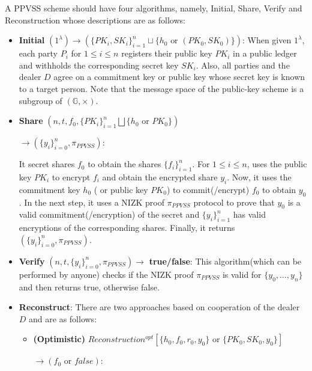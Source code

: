 \begin{definition}[PPVSS]
    A PPVSS scheme should have four algorithms, namely, Initial, Share, Verify and Reconstruction whose 
    descriptions are as follows:
    \begin{itemize}
        \item \textbf{Initial} $(1^\lambda)\rightarrow(\{PK_i,SK_i\}_{i=1}^n\sqcup\{h_0\text{ or }(PK_0,SK_0)\})$: 
          When given $1^\lambda$, each party $P_i$ for $1\leq i\leq n$ registers their public key $PK_i$ in a 
          public ledger and withholds the corresponding secret key $SK_i$. Also, all parties and the dealer $D$ 
          agree on a commitment key or public key whose secret key is known to a target person. 
          Note that the message space of the public-key scheme is a subgroup of $(\mathbb{G},\times)$.
        \item \textbf{Share} $(n,t,f_0,\{PK_i\}_{i=1}^n\bigsqcup\{h_0\text{ or }PK_0\})$\par
          $\rightarrow(\{y_i\}_{i=0}^n,\pi_{PPVSS})$:\par 
          It secret shares $f_0$ to obtain the shares $\{f_i\}_{i=1}^n$. For $1\leq i\leq n$, uses 
          the public key $PK_i$ to encrypt $f_i$ and obtain the encrypted share $y_i$. Now, it uses the commitment 
          key $h_0$ ( or public key $PK_0$) to commit(/encrypt) $f_0$ to obtain $y_0$. 
          In the next step, it uses a NIZK proof $\pi_{PPVSS}$ protocol to prove that $y_0$ is a valid 
          commitment(/encryption) of the secret and $\{y_i\}_{i=1}^n$ has valid encryptions of the corresponding shares. Finally, it returns $(\{y_i\}_{i=0}^n,\pi_{PPVSS})$.\par
        \item \textbf{Verify} $(n,t,\{y_i\}_{i=0}^n,\pi_{PPVSS})\rightarrow$ \textbf{true/false}: 
          This algorithm(which can be performed by anyone) checks if the NIZK proof $\pi_{PPVSS}$ is valid for 
          $\{y_0,\dots,y_n\}$ and then returns true, otherwise false.\par
        \item \textbf{Reconstruct}: There are two approaches based on cooperation of the dealer $D$ and are as follows:
          \begin{itemize}
            \item \textbf{(Optimistic)} $Reconstruction^{opt}[\{h_0,f_0,r_0,y_0\}\text{ or }\{PK_0,SK_0,y_0\}]$\par$\rightarrow(f_0\text{ or }false)$:
              

\end{itemize}
\end{itemize}
\end{definition}
